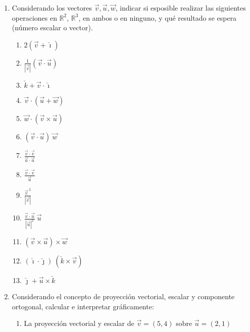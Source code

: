 \documentclass[a4paper]{article}
\newcommand{\exercise}{\item}
\newcommand{\df}[2]{\displaystyle\frac{#1}{#2}}
\newcommand{\vect}[1]{\overrightarrow{#1}}
\begin{document}
\begin{enumerate}
\begin{multicols}{2}
\begin{enumerate} [label=(\alph*)]
		\item $(1,1,2) \times (7,7,14)$
		\item $(10~\vec{r}) \times \vect{F}$ ~con $\vec{r}=(1,2,0)$ ~y~ $\vect{F}=(3,-1,0)$
		\item $\vec{a} \times \vec{b}$ ~con $\vec{a}=5\check{\imath}$ ~y~ $\vec{b}=-2\check{\jmath}$
		\item $\vec{r} \times \vec{p}$ ~con $\vec{r}=5\check{\jmath}$ ~y~ $\vec{p}=\check{\jmath}+7\check{k}$
		\item $\vec{v} \times \vect{AB}$ ~con $\vec{v}=(-1,10,2)$, $A(4,1,3)$ ~y~ $B(4,-6,0)$
	\end{enumerate}
	\end{multicols}
	\exercise Considerando los vectores $\vec{v}, \vec{u} , \vec{w}$, indicar si esposible realizar las siguientes operaciones en $\mathbb{R}^2$, $\mathbb{R}^3$, en ambos o en ninguno, y qué resultado se espera (número escalar o vector). 
	\begin{multicols}{3}
	\begin{enumerate} [label=(\alph*)]
		\item $2(\vec{v}+\check{\imath})$
		\item $\df{1}{|\vec{v}|} (\vec{v} \cdot \vec{u})$
		\item $\check{k}+\vec{v} \cdot \check{\imath}$
		\item $\vec{v} \cdot (\vec{u} + \vec{w})$
		\item $\vec{w} \cdot (\vec{v} \times \vec{u})$
		\item $(\vec{v} \cdot \vec{u}) ~\vec{w}$
		\item $\df{\vec{v} \cdot \vec{v}}{\vec{u} \cdot \vec{u}}$
		\item $\df{\vec{v} \cdot \vec{v}}{\vec{u}}$
		\item $\df{\vec{v}^{~2}}{|\vec{v}|}$
		\item $\df{\vec{v} \cdot \vec{u}}{ |\vec{u}|^2} ~ \vec{u}$
		\item $(\vec{v} \times \vec{u}) \times \vec{w}$
		\item $(\check{\imath} \cdot \check{\jmath}) ~ (\check{k} \times \vec{v})$
		\item $\check{\jmath}+\vec{u} \times \check{k}$
	\end{enumerate}
	\end{multicols}
	\exercise Considerando el concepto de proyección vectorial, escalar y componente ortogonal, calcular e interpretar gráficamente:
	\begin{enumerate} [label=(\alph*)]
		\item La proyección vectorial y escalar de $\vec{v}=(5,4)$ sobre $\vec{u}=(2,1)$

\end{enumerate}
\end{enumerate}
\end{document}
